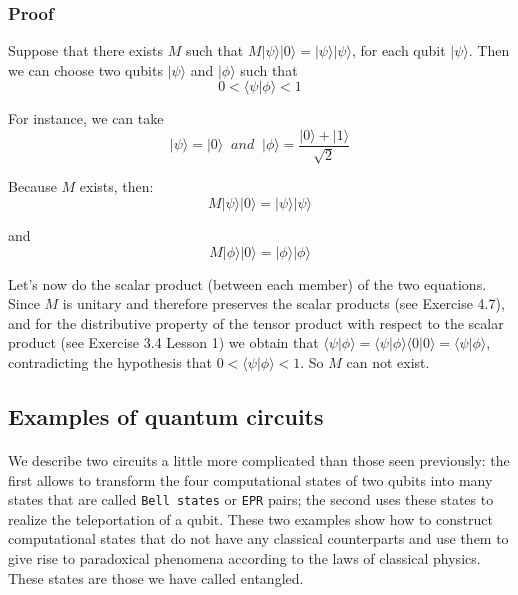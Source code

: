 \documentclass[a4paper,10pt]{article}
\begin{document}
\subsubsection{Proof} Suppose that there exists $M$ such that $M|\psi\rangle|0\rangle = |\psi\rangle|\psi\rangle$, for each qubit $|\psi\rangle$. Then we can choose two qubits $|\psi\rangle$ and $|\phi\rangle$ such that $$0 < \langle\psi|\phi\rangle < 1$$

For instance, we can take
$$|\psi\rangle = |0\rangle \; \; and \; \; |\phi\rangle = \frac{|0\rangle + |1\rangle}{\sqrt{2}}$$ 

Because $M$ exists, then:
$$M |\psi\rangle |0\rangle = |\psi\rangle |\psi\rangle$$

and
$$M |\phi\rangle |0\rangle = |\phi\rangle |\phi\rangle$$

Let's now do the scalar product (between each member) of the two equations. Since $M$ is unitary and therefore preserves the scalar products (see Exercise 4.7), and for the distributive property of the tensor product with respect to the scalar product (see Exercise 3.4 Lesson 1) we obtain that $\langle\psi|\phi\rangle = \langle\psi|\phi\rangle \langle0|0\rangle = \langle\psi|\phi\rangle$, contradicting the hypothesis that $0 < \langle\psi|\phi\rangle < 1$. So $M$ can not exist.

\subsection{Examples of quantum circuits}

\paragraph{} We describe two circuits a little more complicated than those seen previously: the first allows to transform the four computational states of two qubits into many states that are called \texttt{Bell states} or \texttt{EPR} pairs; the second uses these states to realize the teleportation of a qubit. These two examples show how to construct computational states that do not have any classical counterparts and use them to give rise to paradoxical phenomena according to the laws of classical physics. These states are those we have called entangled.
\end{document}
